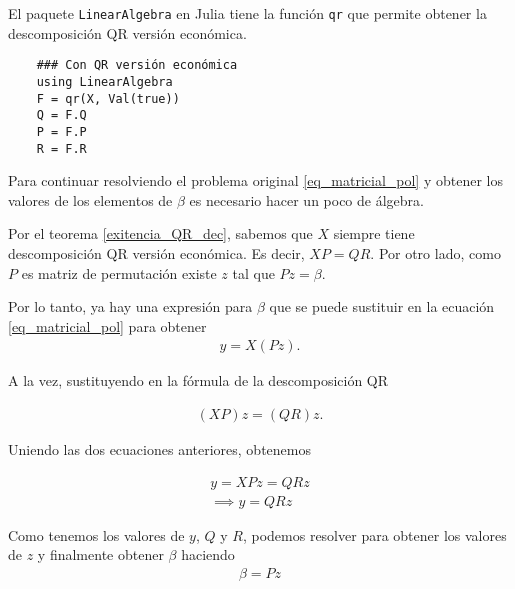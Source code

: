 El paquete \texttt{LinearAlgebra} en \textsf{Julia} tiene la función \texttt{qr} que permite obtener la descomposición QR versión económica.  

\begin{verbatim}
    ### Con QR versión económica
    using LinearAlgebra
    F = qr(X, Val(true))
    Q = F.Q
    P = F.P
    R = F.R
\end{verbatim}



Para continuar resolviendo el problema original \ref{eq_matricial_pol} y obtener los valores de los elementos de $\beta$ es necesario hacer un poco de álgebra. 

Por el teorema \ref{exitencia_QR_dec}, sabemos que $X$ siempre tiene descomposición QR versión económica. Es decir, $XP = QR$. Por otro lado, como $P$ es matriz de permutación existe $z$ tal que $Pz = \beta$. 

Por lo tanto, ya hay una expresión para $\beta$ que se puede sustituir en la ecuación \ref{eq_matricial_pol} para obtener 
\begin{equation*}
    \begin{aligned}
    y = X (Pz) . 
    \end{aligned}
\end{equation*}

A la vez, sustituyendo en la fórmula de la descomposición QR

\begin{equation*}
    \begin{aligned}
    (XP) z = (QR) z . 
    \end{aligned}
\end{equation*}

Uniendo las dos ecuaciones anteriores, obtenemos 

\begin{equation*}
    \begin{aligned}
    y = XP z = QR z \\
    \implies y = QRz
    \end{aligned}
\end{equation*}

Como tenemos los valores de $y$, $Q$ y $R$, podemos resolver para obtener los valores de $z$ y finalmente obtener $\beta$ haciendo 
\begin{equation*}
    \begin{aligned}
    \beta = Pz
    \end{aligned}
\end{equation*}

